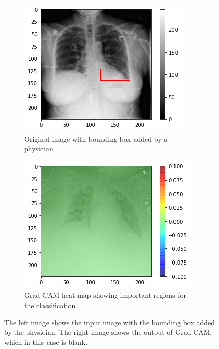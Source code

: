 \begin{figure}[H]
    \centering
    \begin{subfigure}[t]{.45\textwidth}
        \centering
        \includegraphics[width=\linewidth]{chapters/03_classification/images/rise1_bbox.png}
        \caption{Original image with bounding box added by a physician}
    \end{subfigure}\hspace{1cm}%
    \begin{subfigure}[t]{.48\textwidth}
        \centering
        \includegraphics[width=\linewidth]{chapters/03_classification/images/grad-cam_0.png}
        \caption{Grad-CAM heat map showing important regions for the classification}
    \end{subfigure}
    \caption{The left image shows the input image with the bounding box added by the physician. The right image shows the output of Grad-CAM, which in this case is blank.}
\label{grad_cam_example_1}
\end{figure}

